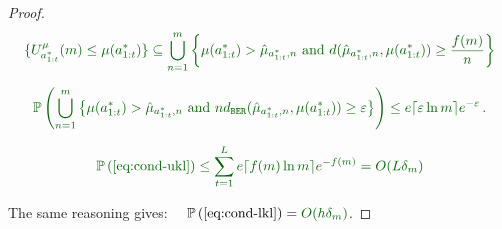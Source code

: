 \begin{proof}
	
	\begin{equation*}
	\diff{\{U^{\mu}_{a^*_{1:t}}(m) \leq \mu(a^*_{1:t})\} \subseteq \bigcup_{n=1}^m \left\{ \mu(a^*_{1:t}) > \hat{\mu}_{a^*_{1:t}, n} \text{ and } d(\hat{\mu}_{a^*_{1:t}, n}, \mu(a^*_{1:t})) \geq \frac{f(m)}{n} \right\}}
	\end{equation*}
	
	
	\begin{equation*}
	\diff{\probability{\bigcup_{n=1}^m \left\{ \mu(a^*_{1:t}) > \hat{\mu}_{a^*_{1:t}, n} \text{ and } n \dber(\hat{\mu}_{a^*_{1:t}, n}, \mu(a^*_{1:t})) \geq \epsilon \right\}} \leq e\ceil{\epsilon \log m}e^{-\epsilon}\,.}
	\end{equation*}
	
	\begin{align*}
	\diff{\probability{\eqref{eq:cond-ukl}} \leq \sum_{t=1}^L e\ceil{f(m)\log m}e^{-f(m)} = O(L\delta_m)}
	\end{align*}
	
	The same reasoning gives: $\quad\displaystyle{
		\probability{\eqref{eq:cond-lkl}} = \diff{O(h\delta_m)}}$.
\end{proof}

